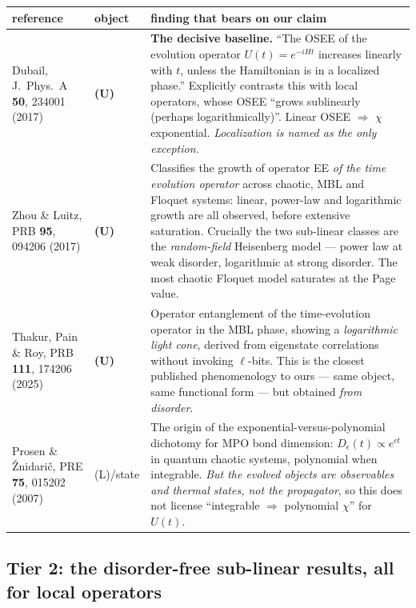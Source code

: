 \documentclass[11pt]{article}
\theoremstyle{plain}
\theoremstyle{remark}
\begin{document}
\begin{longtable}{p{}p{}p{}}
\toprule
reference & object & finding that bears on our claim \\
\midrule
\endhead
Dubail, J.\ Phys.\ A \textbf{50}, 234001 (2017) & \textbf{(U)} &
  \textbf{The decisive baseline.} ``The OSEE of the evolution operator
  $U(t)=e^{-iHt}$ increases linearly with $t$, unless the Hamiltonian is in a
  localized phase.'' Explicitly contrasts this with local operators, whose OSEE
  ``grows sublinearly (perhaps logarithmically)''. Linear OSEE $\Rightarrow$
  $\chi$ exponential. \emph{Localization is named as the only exception.} \\
\addlinespace
Zhou \& Luitz, PRB \textbf{95}, 094206 (2017) & \textbf{(U)} &
  Classifies the growth of operator EE \emph{of the time evolution operator}
  across chaotic, MBL and Floquet systems: linear, power-law and logarithmic
  growth are all observed, before extensive saturation. Crucially the two
  sub-linear classes are the \emph{random-field} Heisenberg model --- power law
  at weak disorder, logarithmic at strong disorder. The most chaotic Floquet
  model saturates at the Page value. \\
\addlinespace
Thakur, Pain \& Roy, PRB \textbf{111}, 174206 (2025) & \textbf{(U)} &
  Operator entanglement of the time-evolution operator in the MBL phase, showing
  a \emph{logarithmic light cone}, derived from eigenstate correlations without
  invoking $\ell$-bits. This is the closest published phenomenology to ours ---
  same object, same functional form --- but obtained \emph{from disorder}. \\
\addlinespace
Prosen \& \v{Z}nidari\v{c}, PRE \textbf{75}, 015202 (2007) & (L)/state &
  The origin of the exponential-versus-polynomial dichotomy for MPO bond
  dimension: $D_\epsilon(t)\propto e^{ct}$ in quantum chaotic systems,
  polynomial when integrable. \emph{But the evolved objects are observables and
  thermal states, not the propagator}, so this does not license
  ``integrable $\Rightarrow$ polynomial $\chi$'' for $U(t)$. \\
\bottomrule
\end{longtable}

\subsection{Tier 2: the disorder-free sub-linear results, all for local operators}
\end{document}
